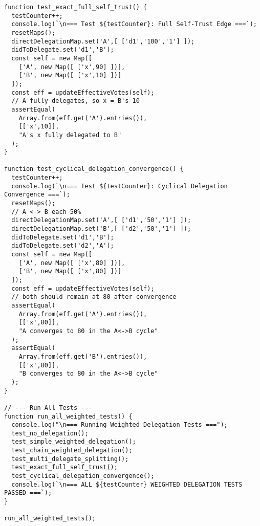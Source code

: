 \begin{verbatim}
function test_exact_full_self_trust() {
  testCounter++;
  console.log(`\n=== Test ${testCounter}: Full Self-Trust Edge ===`);
  resetMaps();
  directDelegationMap.set('A',[ ['d1','100','1'] ]);
  didToDelegate.set('d1','B');
  const self = new Map([
    ['A', new Map([ ['x',90] ])],
    ['B', new Map([ ['x',10] ])]
  ]);
  const eff = updateEffectiveVotes(self);
  // A fully delegates, so x = B's 10
  assertEqual(
    Array.from(eff.get('A').entries()),
    [['x',10]],
    "A's x fully delegated to B"
  );
}

function test_cyclical_delegation_convergence() {
  testCounter++;
  console.log(`\n=== Test ${testCounter}: Cyclical Delegation Convergence ===`);
  resetMaps();
  // A <-> B each 50%
  directDelegationMap.set('A',[ ['d1','50','1'] ]);
  directDelegationMap.set('B',[ ['d2','50','1'] ]);
  didToDelegate.set('d1','B');
  didToDelegate.set('d2','A');
  const self = new Map([
    ['A', new Map([ ['x',80] ])],
    ['B', new Map([ ['x',80] ])]
  ]);
  const eff = updateEffectiveVotes(self);
  // both should remain at 80 after convergence
  assertEqual(
    Array.from(eff.get('A').entries()),
    [['x',80]],
    "A converges to 80 in the A<->B cycle"
  );
  assertEqual(
    Array.from(eff.get('B').entries()),
    [['x',80]],
    "B converges to 80 in the A<->B cycle"
  );
}

// --- Run All Tests ---
function run_all_weighted_tests() {
  console.log("\n=== Running Weighted Delegation Tests ===");
  test_no_delegation();
  test_simple_weighted_delegation();
  test_chain_weighted_delegation();
  test_multi_delegate_splitting();
  test_exact_full_self_trust();
  test_cyclical_delegation_convergence();
  console.log(`\n=== ALL ${testCounter} WEIGHTED DELEGATION TESTS PASSED ===`);
}

run_all_weighted_tests();

\end{verbatim}